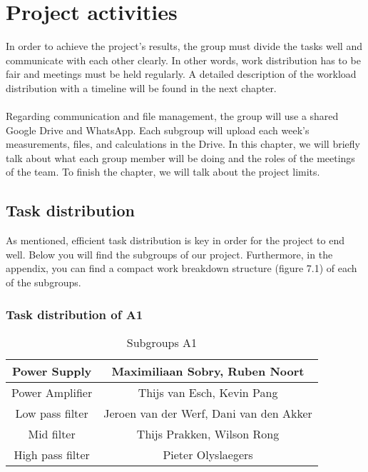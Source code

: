 \chapter{Project activities}
In order to achieve the project's results, the group must divide the tasks well and communicate with each other clearly. In other words, work distribution has to be fair and meetings must be held regularly. A detailed description of the workload distribution with a timeline will be found in the next chapter.\\
\\
Regarding communication and file management, the group will use a shared Google Drive and WhatsApp. Each subgroup will upload each week's measurements, files, and calculations in the Drive.
In this chapter, we will briefly talk about what each group member will be doing and the roles of the meetings of the team. To finish the chapter, we will talk about the project limits.

\section{Task distribution}
As mentioned, efficient task distribution is key in order for the project to end well. Below you will find the subgroups of our project. Furthermore, in the appendix, you can find a compact work breakdown structure (figure 7.1) of each of the subgroups.
\subsection{Task distribution of A1} 
\begin{table}[h]
\centering
\setlength{\arrayrulewidth}{0.5mm}
\setlength{\tabcolsep}{19pt}
\renewcommand{\arraystretch}{1.5}
    \begin{tabular}{|c|c|}
    \hline
    Power Supply     &  Maximiliaan Sobry, Ruben Noort\\
    \hline
    Power Amplifier     &  Thijs van Esch, Kevin Pang   \\
    \hline
    Low pass filter & Jeroen van der Werf, Dani van den Akker\\
    \hline
    Mid filter & Thijs Prakken, Wilson Rong \\
    \hline
    High pass filter & Pieter Olyslaegers \\
    \hline
    \end{tabular}
    \captionsetup{justification=centering}
    \caption{Subgroups A1}
    \label{tab:my_label}
\end{table}
\newpage
\clearpage
